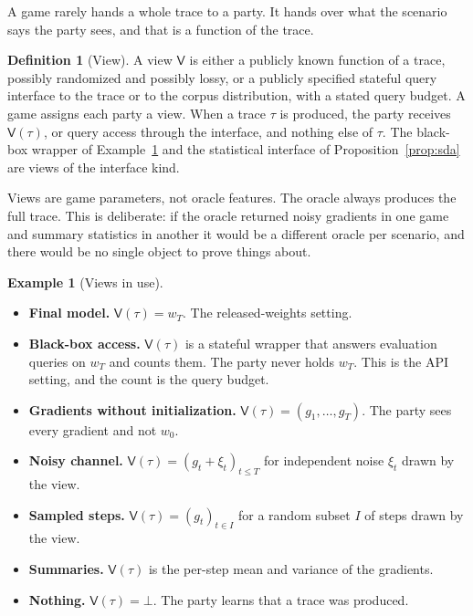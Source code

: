 \documentclass[11pt]{article}
\theoremstyle{definition}
\newtheorem{definition}{Definition}
\newtheorem{example}{Example}
\theoremstyle{plain}
\theoremstyle{remark}
\newcommand{\Tr}{\tau}
\newcommand{\View}{\mathsf{V}}
\begin{document}
A game rarely hands a whole trace to a party. It hands over what the scenario says
the party sees, and that is a function of the trace.

\begin{definition}[View]
\label{def:view}
A view $\View$ is either a publicly known function of a trace, possibly
randomized and possibly lossy, or a publicly specified stateful query interface
to the trace or to the corpus distribution, with a stated query budget. A game
assigns each party a view. When a trace $\Tr$ is produced, the party receives
$\View(\Tr)$, or query access through the interface, and nothing else of
$\Tr$. The black-box wrapper of Example~\ref{ex:views} and the statistical
interface of Proposition~\ref{prop:sda} are views of the interface kind.
\end{definition}

Views are game parameters, not oracle features. The oracle always produces the
full trace. This is deliberate: if the oracle returned noisy gradients in one game
and summary statistics in another it would be a different oracle per scenario, and
there would be no single object to prove things about.

\begin{example}[Views in use]
\label{ex:views}
\begin{itemize}
  \item \textbf{Final model.} $\View(\Tr) = w_T$. The released-weights setting.
  \item \textbf{Black-box access.} $\View(\Tr)$ is a stateful wrapper that answers
        evaluation queries on $w_T$ and counts them. The party never holds $w_T$.
        This is the API setting, and the count is the query budget.
  \item \textbf{Gradients without initialization.}
        $\View(\Tr) = (g_1, \dots, g_T)$. The party sees every gradient and not
        $w_0$.
  \item \textbf{Noisy channel.} $\View(\Tr) = (g_t + \xi_t)_{t \le T}$ for
        independent noise $\xi_t$ drawn by the view.
  \item \textbf{Sampled steps.} $\View(\Tr) = (g_t)_{t \in I}$ for a random subset
        $I$ of steps drawn by the view.
  \item \textbf{Summaries.} $\View(\Tr)$ is the per-step mean and variance of the
        gradients.
  \item \textbf{Nothing.} $\View(\Tr) = \bot$. The party learns that a trace was
        produced.
\end{itemize}
\end{example}
\end{document}

